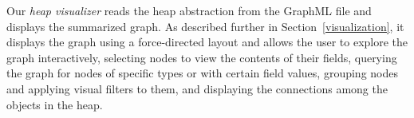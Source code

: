 Our \emph{heap visualizer} reads the heap abstraction from the GraphML file
and displays the summarized graph.  As described further in
Section~\ref{visualization}, it displays the graph using a force-directed 
layout and allows the user to explore the graph interactively,
selecting nodes to view the contents of their fields, querying the graph
for nodes of specific types or with certain field values, grouping nodes
and applying visual filters to them, and displaying the connections among 
the objects in the heap.

